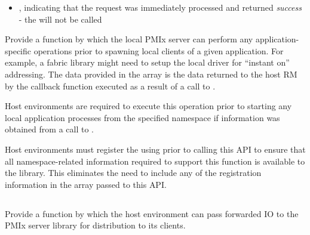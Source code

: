 \returnstart
\begin{itemize}
    \item {}, indicating that the request was immediately processed and returned \textit{success} - the  will not be called
\end{itemize}
\returnend

\descr

Provide a function by which the local \ac{PMIx} server can perform any application-specific operations prior to spawning local clients of a given application. For example, a fabric library might need to setup the local driver for ``instant on'' addressing. The data provided in the  array is the data returned to the host \ac{RM} by the callback function executed as a result of a call to .

\advicermstart
Host environments are required to execute this operation prior to starting any local application processes from the specified namespace if information was obtained from a call to .

Host environments must register the  using  prior to calling this \ac{API} to ensure that all namespace-related information required to support this function is available to the library. This eliminates the need to include any of the registration information in the  array passed to this \ac{API}.
\advicermend

\subsection{}

\summary

Provide a function by which the host environment can pass forwarded \ac{IO} to the \ac{PMIx} server library for distribution to its clients.

\format



